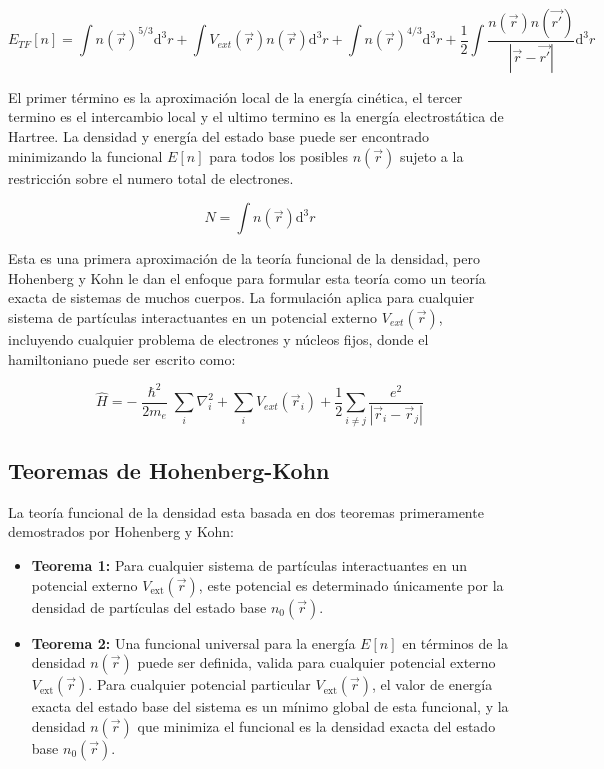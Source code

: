 \begin{equation}
    E_{TF}[n]=\int n(\vec{r})^{5/3}\mathrm{d}^{3}r+\int V_{ext}(\vec{r})n(\vec{r})\mathrm{d}^{3}r+ \int n(\vec{r})^{4/3}\mathrm{d}^{3}r+\frac{1}{2}\int  \frac{n(\vec{r})n(\vec{r'})}{|\vec{r}-\vec{r'}|}\mathrm{d}^{3}r
\end{equation}

El primer término es la aproximación local de la energía cinética, el tercer termino es el intercambio local y el ultimo termino es la energía electrostática de Hartree. La densidad y energía del estado base puede ser encontrado minimizando la funcional $E[n]$ para todos los posibles $n(\vec{r})$ sujeto a la restricción sobre el numero total de electrones.

\begin{equation}
    N=\int n(\vec{r})\mathrm{d}^{3}r
\end{equation}

Esta es una primera aproximación de la teoría funcional de la densidad, pero Hohenberg y Kohn le dan el enfoque para formular esta teoría como un teoría exacta de sistemas de muchos cuerpos. La formulación aplica para cualquier sistema de partículas interactuantes en un potencial externo $V_{ext}(\vec{r})$, incluyendo cualquier problema de electrones y núcleos fijos, donde el hamiltoniano puede ser escrito como:

\begin{equation}
    \hat{H}=-\frac{\hslash^{2}}{2m_{e}}\sum_{i}\nabla_{i}^{2}+\sum_{i}V_{ext}(\vec{r}_{i})+\frac{1}{2}\sum_{i\neq j}\frac{e^{2}}{|\vec{r}_{i}-\vec{r}_{j}|}
    \label{Eq. Hamiltonian_HK}
\end{equation}

\subsection{Teoremas de Hohenberg-Kohn}

La teoría funcional de la densidad esta basada en dos teoremas primeramente demostrados por Hohenberg y Kohn\cite{P.Hohemberg1964InhomogeneousGas}:

\begin{itemize}
    \item \textbf{Teorema 1:} Para cualquier sistema de partículas interactuantes en un potencial externo $V_{\text{ext}}(\vec{r})$, este potencial es determinado únicamente por la densidad de partículas del estado base $n_{0}(\vec{r})$.
    \item \textbf{Teorema 2:}  Una funcional universal para la energía $E[n]$ en términos de la densidad $n(\vec{r})$ puede ser definida, valida para cualquier potencial externo $V_{\text{ext}}(\vec{r})$. Para cualquier potencial particular $V_{\text{ext}}(\vec{r})$, el valor de energía exacta del estado base del sistema es un mínimo global de esta funcional, y  la densidad $n(\vec{r})$ que minimiza el funcional es la densidad exacta del estado base $n_{0}(\vec{r})$.
\end{itemize}

